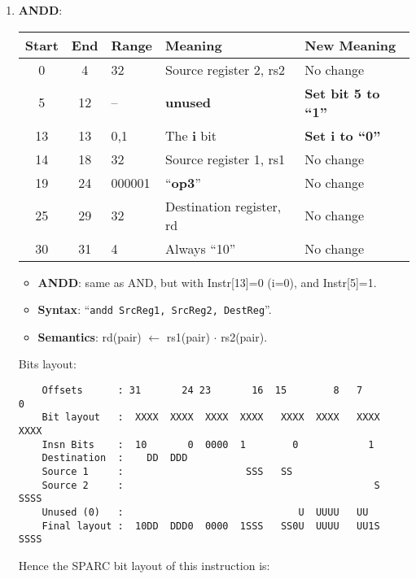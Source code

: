 \begin{enumerate}
\item \textbf{ANDD}:\\
  \begin{center}
    \begin{tabular}[p]{|c|c|l|l|l|}
      \hline
      \textbf{Start} & \textbf{End} & \textbf{Range} & \textbf{Meaning} &
                                                                          \textbf{New Meaning}\\
      \hline
      0 & 4 & 32 & Source register 2, rs2 & No change \\
      5 & 12 & -- & \textbf{unused} & \textbf{Set bit 5 to ``1''} \\
      13 & 13 & 0,1 & The \textbf{i} bit & \textbf{Set i to ``0''} \\
      14 & 18 & 32 & Source register 1, rs1 & No change \\
      19 & 24 & 000001 & ``\textbf{op3}'' & No change \\
      25 & 29 & 32 & Destination register, rd & No change \\
      30 & 31 & 4 & Always ``10'' & No change \\
      \hline
    \end{tabular}
  \end{center}
  \begin{itemize}
  \item []\textbf{ANDD}: same as AND, but with Instr[13]=0 (i=0), and
    Instr[5]=1.
  \item []\textbf{Syntax}: ``\texttt{andd  SrcReg1, SrcReg2, DestReg}''.
  \item []\textbf{Semantics}: rd(pair) $\leftarrow$ rs1(pair) $\cdot$ rs2(pair).
  \end{itemize}
  Bits layout:
\begin{verbatim}
    Offsets      : 31       24 23       16  15        8   7        0
    Bit layout   :  XXXX  XXXX  XXXX  XXXX   XXXX  XXXX   XXXX  XXXX
    Insn Bits    :  10       0  0000  1        0            1       
    Destination  :    DD  DDD                                       
    Source 1     :                     SSS   SS
    Source 2     :                                           S  SSSS
    Unused (0)   :                              U  UUUU   UU        
    Final layout :  10DD  DDD0  0000  1SSS   SS0U  UUUU   UU1S  SSSS
\end{verbatim}

  Hence the SPARC bit layout of this instruction is:


\end{enumerate}
